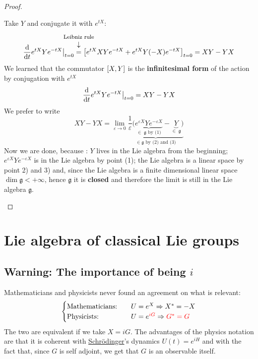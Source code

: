 \documentclass[../main.tex]{subfiles}
\begin{document}
\begin{proof}
\begin{enumerate}
    Take $Y$ and conjugate it with $e^{tX}$:
    \[
    \dv{t}e^{tX}Ye^{-tX}\big|_{t=0}\overset{\mathclap{\tikz \node {$\downarrow$} node [above=1.25ex] {\footnotesize Leibniz rule};}}{=}\left[e^{tX}XYe^{-tX}+e^{tX}Y(-X)e^{-tX}\right]_{t=0}=XY-YX
    \]
    {\selectfont{}\relax} We learned that the commutator $\comm{X}{Y}$ is the \textbf{infinitesimal form} of the action by conjugation with $e^{tX}$
    \[
    \dv{t}e^{tX}Ye^{-tX}\big|_{t=0}=XY-YX
    \]
    We prefer to write
    \[
    XY-YX=\lim_{\varepsilon\to 0}\underbrace{\frac{1}{\varepsilon}\Big(\underbrace{e^{\varepsilon X}Ye^{-\varepsilon X}}_{\in\;\mathfrak{g}\textrm{ by (1)}}-\underbrace{Y}_{\in\;\mathfrak{g}}\Big)}_{\in\mathfrak{g} \textrm{ by (2) and (3)}}
    \]
    Now we are done, because : $Y$ lives in the Lie algebra from the beginning; $e^{\varepsilon X}Ye^{-\varepsilon X}$ is in the Lie algebra by point (1); the Lie algebra is a linear space by point 2) and 3) and, since the Lie algebra is a finite dimensional linear space $\dim\mathfrak{g}<+\infty$, hence $\mathfrak{g}$ it is \textbf{closed} and therefore the limit is still in the Lie algebra $\mathfrak{g}$.
\end{enumerate}
\end{proof}
\section{Lie algebra of classical Lie groups}
\subsection{Warning: The importance of being $i$}
{\selectfont{}\relax} Mathematicians and physicists never found an agreement on what is relevant:
\[
\begin{cases}
\text{Mathematicians:} \quad &U=e^X\Rightarrow X^*=-X \\
\text{Physicists:} \quad &U=e^{\color{red}iG}\Rightarrow{\color{red}G^*=G}
\end{cases}
\]
The two are equivalent if we take $X=iG$. The advantages of the physics notation are that it is coherent with \href{https://en.wikipedia.org/wiki/Erwin_Schr\%C3\%B6dinger}{Schr\"odinger}'s dynamics $U(t)=e^{iH}$ and with the fact that, since $G$ is self adjoint, we get that $G$ is an observable itself.
\end{document}
